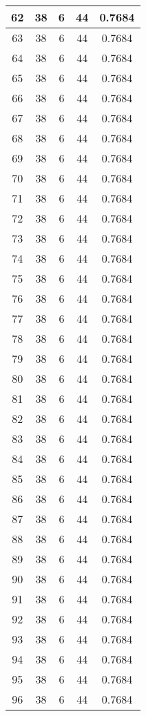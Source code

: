 \documentclass[letterpaper, 12pt]{article}
\begin{document}
\begin{longtable}{|c|c|c|c|c|}
\hline
62 & 38 & 6 & 44 & 0.7684 \\
\hline
63 & 38 & 6 & 44 & 0.7684 \\
\hline
64 & 38 & 6 & 44 & 0.7684 \\
\hline
65 & 38 & 6 & 44 & 0.7684 \\
\hline
66 & 38 & 6 & 44 & 0.7684 \\
\hline
67 & 38 & 6 & 44 & 0.7684 \\
\hline
68 & 38 & 6 & 44 & 0.7684 \\
\hline
69 & 38 & 6 & 44 & 0.7684 \\
\hline
70 & 38 & 6 & 44 & 0.7684 \\
\hline
71 & 38 & 6 & 44 & 0.7684 \\
\hline
72 & 38 & 6 & 44 & 0.7684 \\
\hline
73 & 38 & 6 & 44 & 0.7684 \\
\hline
74 & 38 & 6 & 44 & 0.7684 \\
\hline
75 & 38 & 6 & 44 & 0.7684 \\
\hline
76 & 38 & 6 & 44 & 0.7684 \\
\hline
77 & 38 & 6 & 44 & 0.7684 \\
\hline
78 & 38 & 6 & 44 & 0.7684 \\
\hline
79 & 38 & 6 & 44 & 0.7684 \\
\hline
80 & 38 & 6 & 44 & 0.7684 \\
\hline
81 & 38 & 6 & 44 & 0.7684 \\
\hline
82 & 38 & 6 & 44 & 0.7684 \\
\hline
83 & 38 & 6 & 44 & 0.7684 \\
\hline
84 & 38 & 6 & 44 & 0.7684 \\
\hline
85 & 38 & 6 & 44 & 0.7684 \\
\hline
86 & 38 & 6 & 44 & 0.7684 \\
\hline
87 & 38 & 6 & 44 & 0.7684 \\
\hline
88 & 38 & 6 & 44 & 0.7684 \\
\hline
89 & 38 & 6 & 44 & 0.7684 \\
\hline
90 & 38 & 6 & 44 & 0.7684 \\
\hline
91 & 38 & 6 & 44 & 0.7684 \\
\hline
92 & 38 & 6 & 44 & 0.7684 \\
\hline
93 & 38 & 6 & 44 & 0.7684 \\
\hline
94 & 38 & 6 & 44 & 0.7684 \\
\hline
95 & 38 & 6 & 44 & 0.7684 \\
\hline
96 & 38 & 6 & 44 & 0.7684 \\

\end{longtable}
\end{document}
